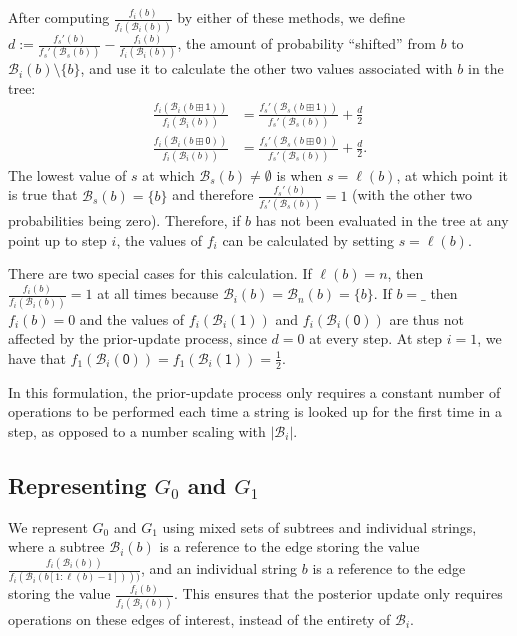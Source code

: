 \documentclass{IEEEtran}
\begin{document}
After computing $\frac{f_i(b)}{f_i(\mathcal{B}_i(b))}$ by either
of these methods, we define
$d:= \frac{f_s'(b)}{f_s'(\mathcal{B}_s(b))}
-\frac{f_i(b)}{f_i(\mathcal{B}_i(b))}$, the amount of probability
``shifted'' from $b$ to $\mathcal{B}_i(b)\setminus\{b\}$,
and use it to calculate the other two values associated with $b$ in the tree:
\begin{align}
\frac{f_i(\mathcal{B}_i(b\boxplus \mathsf{1}))}
{f_i(\mathcal{B}_i(b))}&=\frac{f_s'(\mathcal{B}_s(b\boxplus \mathsf{1}))}
{f_s'(\mathcal{B}_s(b))}+\frac{d}{2}\\
\frac{f_i(\mathcal{B}_i(b\boxplus \mathsf{0}))}
{f_i(\mathcal{B}_i(b))}&=\frac{f_s'(\mathcal{B}_s(b\boxplus \mathsf{0}))}
{f_s'(\mathcal{B}_s(b))}+\frac{d}{2}.
\end{align}
The lowest value of $s$ at which $\mathcal{B}_s(b) \neq \emptyset$
is when $s=\ell(b)$, at which point it is
true that $\mathcal{B}_s(b) =\{b\}$ and therefore
$\frac{f_s'(b)}{f_s'(\mathcal{B}_s(b))}=1$ (with the other two probabilities
being zero). Therefore, if $b$ has not been evaluated in the tree at
any point up to step $i$,
the values of $f_i$ can be calculated by setting $s=\ell(b)$.

There are two special cases for this calculation.
If $\ell(b) = n$, then $\frac{f_i(b)}{f_i(\mathcal{B}_i(b))}=1$ at all
times because $\mathcal{B}_i(b)=\mathcal{B}_n(b)=\{b\}$. If
$b=\mathsf{\_}$ then $f_i(b)=0$ and the values of
$f_i(\mathcal{B}_i(\mathsf{1}))$ and $f_i(\mathcal{B}_i(\mathsf{0}))$
are thus not affected by the prior-update process, since $d=0$ at
every step. At step $i=1$, we have that $f_1(\mathcal{B}_i(\mathsf{0}))
=f_1(\mathcal{B}_i(\mathsf{1}))=\frac{1}{2}$.

In this formulation, the prior-update process only requires a constant
number of operations to be performed each time a string is looked up
for the first time in a step,
as opposed to a number scaling with $|\mathcal{B}_i|$.

\subsection{Representing $G_0$ and $G_1$}
We represent $G_0$ and $G_1$ using mixed sets of subtrees and individual
strings, where a subtree $\mathcal{B}_i(b)$ is a reference to the edge
storing the value
$\frac{f_i(\mathcal{B}_i(b))}{f_i(\mathcal{B}_i(b[1:\ell(b)-1])))}$, and
an individual string $b$ is a reference to the edge storing the value
$\frac{f_i(b)}{f_i(\mathcal{B}_i(b))}$. This ensures that the posterior
update only requires operations on these edges of interest, instead of
the entirety of $\mathcal{B}_i$.
\end{document}
